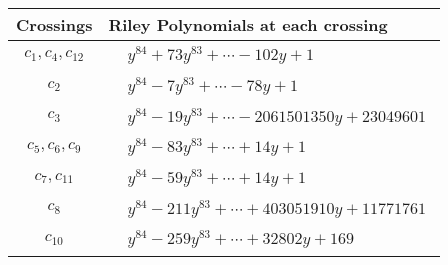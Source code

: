 \documentclass[1p]{elsarticle_modified}
\theoremstyle{definition}
\begin{document}
\begin{tabular}{m{50pt}|m{274pt}}
Crossings & \hspace{64pt}Riley Polynomials at each crossing \\
\hline $$\begin{aligned}c_{1},c_{4},c_{12}\end{aligned}$$&$\begin{aligned}
&y^{84}+73 y^{83}+\cdots-102 y+1
\end{aligned}$\\
\hline $$\begin{aligned}c_{2}\end{aligned}$$&$\begin{aligned}
&y^{84}-7 y^{83}+\cdots-78 y+1
\end{aligned}$\\
\hline $$\begin{aligned}c_{3}\end{aligned}$$&$\begin{aligned}
&y^{84}-19 y^{83}+\cdots-2061501350 y+23049601
\end{aligned}$\\
\hline $$\begin{aligned}c_{5},c_{6},c_{9}\end{aligned}$$&$\begin{aligned}
&y^{84}-83 y^{83}+\cdots+14 y+1
\end{aligned}$\\
\hline $$\begin{aligned}c_{7},c_{11}\end{aligned}$$&$\begin{aligned}
&y^{84}-59 y^{83}+\cdots+14 y+1
\end{aligned}$\\
\hline $$\begin{aligned}c_{8}\end{aligned}$$&$\begin{aligned}
&y^{84}-211 y^{83}+\cdots+403051910 y+11771761
\end{aligned}$\\
\hline $$\begin{aligned}c_{10}\end{aligned}$$&$\begin{aligned}
&y^{84}-259 y^{83}+\cdots+32802 y+169
\end{aligned}$\\
\hline
\end{tabular}
\vskip 2pc
\end{document}
